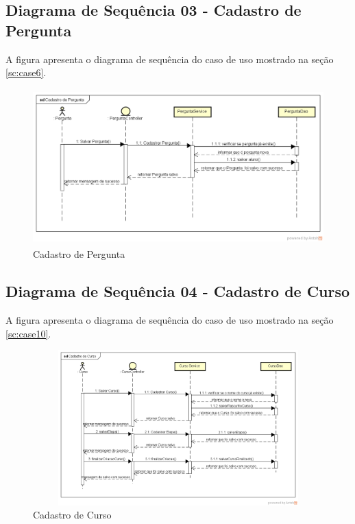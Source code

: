 \subsection{Diagrama de Sequência 03 - Cadastro de Pergunta}
A figura  apresenta o diagrama de sequência do caso de uso mostrado na seção \ref{sc:case6}.
\begin{figure}[htp]
\begin{center}
  \includegraphics[width=15cm, height=6cm]{images/proposta-img/Figura4-5.png}
  \caption{Cadastro de Pergunta}
  \label{fig:Figura4-5}
\end{center}
\end{figure}
\subsection{Diagrama de Sequência 04 - Cadastro de Curso}
A figura  apresenta o diagrama de sequência do caso de uso mostrado na seção \ref{sc:case10}.
\begin{figure}[htp]
\begin{center}
  \includegraphics[width=15cm, height=6cm]{images/proposta-img/Figura4-6.png}
  \caption{Cadastro de Curso}
  \label{fig:Figura4-6}
\end{center}
\end{figure}


